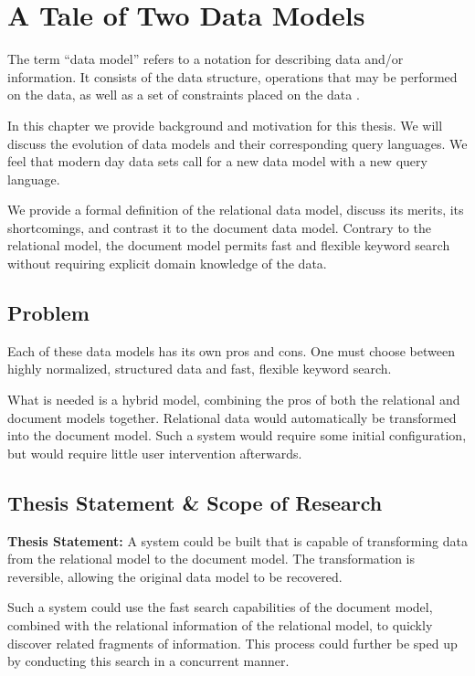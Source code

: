 \chapter{A Tale of Two Data Models}
\label{chap:tale-of-two-data-models}
	The term ``data model'' refers to a notation for describing data and/or information.  It consists of the data structure, operations that may be performed on the data, as well as a set of constraints placed on the data \cite{dbsys-06}.
	
	In this chapter we provide background and motivation for this thesis.  We will discuss the evolution of data models and their corresponding query languages.  We feel that modern day data sets call for a new data model with a new query language.
	
	We provide a formal definition of the relational data model, discuss its merits, its shortcomings, and contrast it to the document data model.  Contrary to the relational model, the document model permits fast and flexible keyword search without requiring explicit domain knowledge of the data.
	
	
	
	
	
	\section{Problem}
		Each of these data models has its own pros and cons.  One must choose between highly normalized, structured data and fast, flexible keyword search.
		
		What is needed is a hybrid model, combining the pros of both the relational and document models together.  Relational data would automatically be transformed into the document model.  Such a system would require some initial configuration, but would require little user intervention afterwards.
	
	\section{Thesis Statement \& Scope of Research}
		\begin{displayquote}
			\textbf{Thesis Statement:}  A system could be built that is capable of transforming data from the relational model to the document model.  The transformation is reversible, allowing the original data model to be recovered.
			
			Such a system could use the fast search capabilities of the document model, combined with the relational information of the relational model, to quickly discover related fragments of information.  This process could further be sped up by conducting this search in a concurrent manner.
		\end{displayquote}
		
